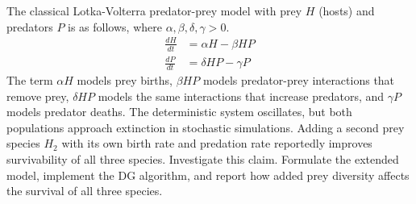 \begin{modelingproject}
\item %
The classical Lotka-Volterra\cite{lotka1925elements,volterra1926variazioni} predator-prey model with prey $H$ (hosts) and predators $P$ is as follows, where $\alpha, \beta, \delta, \gamma > 0$.
\begin{align*}
\frac{dH}{dt} &= \alpha H - \beta H P \\
\frac{dP}{dt} &= \delta H P - \gamma P
\end{align*}
The term $\alpha H$ models prey births, $\beta HP$ models predator-prey interactions that remove prey, $\delta HP$ models the same interactions that increase predators, and $\gamma P$ models predator deaths. The deterministic system oscillates, but both populations approach extinction in stochastic simulations. Adding a second prey species $H_2$ with its own birth rate and predation rate reportedly improves survivability of all three species. Investigate this claim. Formulate the extended model, implement the DG algorithm, and report how added prey diversity affects the survival of all three species.





\end{modelingproject}
